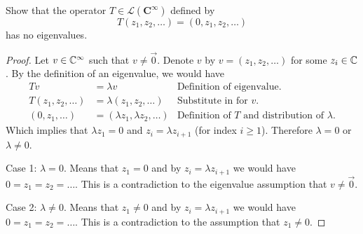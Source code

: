 Show that the operator $T \in \mathcal{L}(\mathbf{C}^\infty)$ defined by
        \[
        T(z_1,z_2, \ldots) = (0,z_1,z_2, \ldots)
        \]
        has no eigenvalues.
        \begin{mybox}
                \begin{proof}
                        Let $v \in \mathbb{C}^{\infty}$ such that $v\neq \vec0$. Denote $v$ by $v = (z_1,z_2, \ldots)$ for some $z_i \in \mathbb{C}$.  By the definition of an eigenvalue, we would have
                        \begin{align*}
                                Tv &= \lambda v & \text{Definition of eigenvalue.}\\
                                T(z_1, z_2, \dots)  &= \lambda(z_1, z_2, \dots)& \text{Substitute in for }v.\\
                                (0, z_1, \dots) &= (\lambda z_1, \lambda z_2, \dots) & \text{Definition of } T \text{ and distribution of }\lambda. 
                        \end{align*}
                        Which implies that $\lambda z_1 = 0$ and $z_i = \lambda z_{i+1}$ (for index $i \geq 1$). Therefore $\lambda = 0$ or $\lambda \neq 0$.

                        \nl Case 1: $\lambda = 0$. Means that $z_1 = 0$ and by $z_i = \lambda z_{i+1}$ we would have \\$0 = z_1 = z_2 = \dots$. This is a contradiction to the eigenvalue assumption that $v \neq \vec0$. 

                        \nnl Case 2: $\lambda \neq 0$. Means that $z_1 \neq 0$ and by $z_i = \lambda z_{i+1}$ we would have \\$0 = z_1 = z_2 = \dots$. This is a contradiction to the assumption that $z_1 \neq 0$. 
                \end{proof}
        \end{mybox}